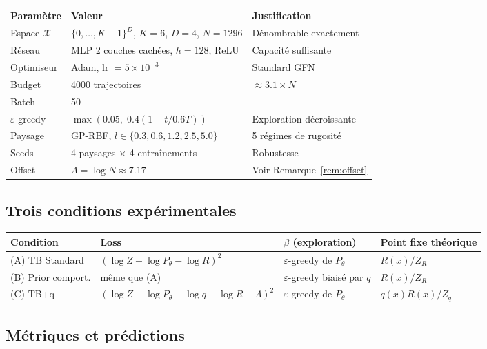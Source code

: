 \documentclass[11pt,a4paper]{article}
\theoremstyle{plain}
\theoremstyle{definition}
\theoremstyle{remark}
\newcommand{\calX}{\mathcal{X}}
\newcommand{\logZ}{\log Z}
\newcommand{\pth}{P_\theta}
\begin{document}
\begin{center}
\begin{tabular}{lll}
\toprule
Paramètre & Valeur & Justification \\
\midrule
Espace $\calX$ & $\{0,\ldots,K-1\}^D$, $K=6$, $D=4$, $N=1296$ & Dénombrable exactement \\
Réseau & MLP 2 couches cachées, $h=128$, ReLU & Capacité suffisante \\
Optimiseur & Adam, lr $= 5 \times 10^{-3}$ & Standard GFN \\
Budget & 4000 trajectoires & $\approx 3.1 \times N$ \\
Batch & 50 & — \\
$\varepsilon$-greedy & $\max(0.05,\; 0.4(1 - t/0.6T))$ & Exploration décroissante \\
Paysage & GP-RBF, $l \in \{0.3, 0.6, 1.2, 2.5, 5.0\}$ & 5 régimes de rugosité \\
Seeds & 4 paysages $\times$ 4 entraînements & Robustesse \\
Offset & $\Lambda = \log N \approx 7.17$ & Voir Remarque~\ref{rem:offset} \\
\bottomrule
\end{tabular}
\end{center}

\subsection{Trois conditions expérimentales}

\begin{center}
\begin{tabular}{llll}
\toprule
Condition & Loss & $\beta$ (exploration) & Point fixe théorique \\
\midrule
(A) TB Standard & $(\logZ + \log\pth - \log R)^2$ & $\varepsilon$-greedy de $\pth$ & $R(x)/Z_R$ \\
(B) Prior comport. & même que (A) & $\varepsilon$-greedy biaisé par $q$ & $R(x)/Z_R$ \\
(C) TB+q & $(\logZ + \log\pth - \log q - \log R - \Lambda)^2$ & $\varepsilon$-greedy de $\pth$ & $q(x)R(x)/Z_q$ \\
\bottomrule
\end{tabular}
\end{center}

\subsection{Métriques et prédictions}
\end{document}
